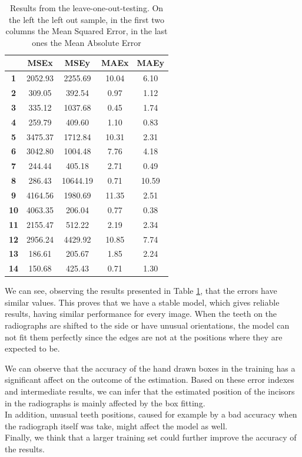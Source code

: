 \documentclass[a4paper]{article}
\begin{document}
\begin{table}[h]
    \centering
    \begin{tabular}{c||c|c|c|c|}
    & \textbf{MSEx} & \textbf{MSEy} & \textbf{MAEx} & \textbf{MAEy} \\
    \hline \hline
    \textbf{1} & 2052.93 & 2255.69 & 10.04 & 6.10\\ \hline
    \textbf{2} & 309.05 & 392.54 & 0.97 & 1.12\\ \hline
    \textbf{3} & 335.12 & 1037.68 & 0.45 & 1.74\\ \hline
    \textbf{4} & 259.79 & 409.60 & 1.10 & 0.83\\ \hline
    \textbf{5} & 3475.37 & 1712.84 & 10.31 & 2.31\\ \hline
    \textbf{6} & 3042.80 & 1004.48 & 7.76 & 4.18\\ \hline
    \textbf{7} & 244.44 & 405.18 & 2.71 & 0.49\\ \hline
    \textbf{8} & 286.43 & 10644.19 & 0.71 & 10.59\\ \hline
    \textbf{9} & 4164.56 & 1980.69 & 11.35 & 2.51\\ \hline
    \textbf{10} & 4063.35 & 206.04 & 0.77 & 0.38\\ \hline
    \textbf{11} & 2155.47 & 512.22 & 2.19 & 2.34\\ \hline
    \textbf{12} & 2956.24 & 4429.92 & 10.85 & 7.74\\ \hline
    \textbf{13} & 186.61 & 205.67 & 1.85 & 2.24\\ \hline
    \textbf{14} & 150.68 & 425.43 & 0.71 & 1.30\\
    \hline
    \end{tabular}
    \caption{Results from the leave-one-out-testing. On the left the left out sample, in the first two columns the Mean Squared Error, in the last ones the Mean Absolute Error}
    \label{table:leaveoneout}
\end{table}
We can see, observing the results presented in Table \ref{table:leaveoneout}, that the errors have similar values. 
This proves that we have a stable model, which gives reliable results, having similar performance for every image. When the teeth on the radiographs are shifted to the side or have unusual orientations, the model can not fit them perfectly since the edges are not at the positions where they are expected to be. 

We can observe that the accuracy of the hand drawn boxes in the training has a significant affect on the outcome of the estimation. Based on these error indexes and intermediate results, we can infer that the estimated position of the incisors in the radiographs is mainly affected by the box fitting. \\
In addition, unusual teeth positions, caused for example by a bad accuracy when the radiograph itself was take, might affect the model as well. \\
Finally, we think that a larger training set could further improve the accuracy of the results. 
\end{document}
